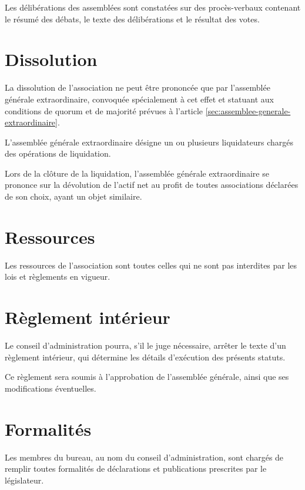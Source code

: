 \documentclass[12 pt]{article}
\begin{document}
Les délibérations des assemblées sont constatées sur des
procès-verbaux contenant le résumé des débats, le texte des
délibérations et le résultat des votes.


\section{Dissolution}
\label{sec:dissolution}

La dissolution de l'association ne peut être prononcée que par
l'assemblée générale extraordinaire, convoquée spécialement à cet
effet et statuant aux conditions de quorum et de majorité prévues à
l'article \ref{sec:assemblee-generale-extraordinaire}.

L'assemblée générale extraordinaire désigne un ou plusieurs
liquidateurs chargés des opérations de liquidation.

Lors de la clôture de la liquidation, l'assemblée générale
extraordinaire se prononce sur la dévolution de l'actif net au profit
de toutes associations déclarées de son choix, ayant un objet
similaire.

\section{Ressources}
\label{sec:ressources}

Les ressources de l'association sont toutes celles qui ne sont pas
interdites par les lois et règlements en vigueur.

\section{Règlement intérieur}
\label{sec:reglement-interieur}

Le conseil d'administration pourra, s'il le juge nécessaire, arrêter
le texte d'un règlement intérieur, qui détermine les détails
d'exécution des présents statuts.

Ce règlement sera soumis à l'approbation de l'assemblée générale,
ainsi que ses modifications éventuelles.

\section{Formalités}
\label{sec:formalites}

Les membres du bureau, au nom du conseil d'administration, sont
chargés de remplir toutes formalités de déclarations et publications
prescrites par le législateur.
\end{document}
